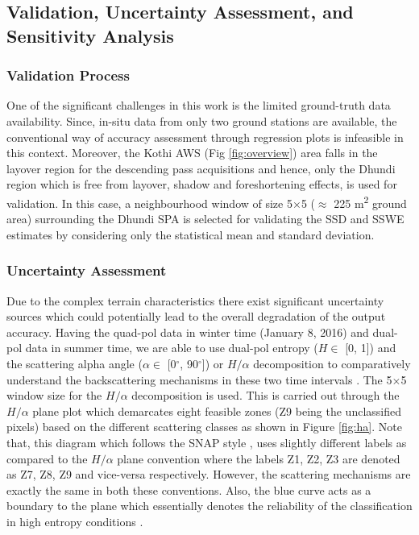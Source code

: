 \documentclass[12pt]{elsarticle}
\numberwithin{equation}{section}
\numberwithin{figure}{section}
\numberwithin{table}{section}
\begin{document}
\subsection{Validation, Uncertainty Assessment, and Sensitivity Analysis}
\label{ssec:vus}
\subsubsection{Validation Process}
\label{sssec:val}

One of the significant challenges in this work is the limited ground-truth data availability. Since, in-situ data from only two ground stations are available, the conventional way of accuracy assessment through regression plots \citep{Kugler2015, Leinss2014, Kumar2017} is infeasible in this context. Moreover, the Kothi AWS (Fig \ref{fig:overview}) area falls in the layover region for the descending pass acquisitions and hence, only the Dhundi region which is free from layover, shadow and foreshortening effects, is used for validation. In this case, a neighbourhood window of size 5$\times$5 ($\approx$ 225 m\textsuperscript{2} ground area) surrounding the Dhundi SPA is selected for validating the SSD and SSWE estimates by considering only the statistical mean and standard deviation.

\subsubsection{Uncertainty Assessment}
\label{sssec:ua}

Due to the complex terrain characteristics there exist significant uncertainty sources which could potentially lead to the overall degradation of the output accuracy. Having the quad-pol data in winter time (January 8, 2016) and dual-pol data in summer time, we are able to use dual-pol entropy ($H \in$ [0, 1]) and the scattering alpha angle ($\alpha \in$ [0$^\circ$, 90$^\circ$]) or $H/{\alpha}$ decomposition to comparatively understand the backscattering mechanisms in these two time intervals \citep{Cloude2010, Lee2009, Singh2014}. The 5$\times$5 window size for the $H/{\alpha}$ decomposition is used. This is carried out through the $H/{\alpha}$ plane plot which demarcates eight feasible zones (Z9 being the unclassified pixels) based on the different scattering classes as shown in Figure \ref{fig:ha}. Note that, this diagram which follows the SNAP style \citep{ESA2019}, uses slightly different labels as compared to the \cite{Lee2009} $H/{\alpha}$ plane convention where the labels Z1, Z2, Z3 are denoted as Z7, Z8, Z9 and vice-versa respectively. However, the scattering mechanisms are exactly the same in both these conventions. Also, the blue curve acts as a boundary to the plane which essentially denotes the reliability of the classification in high entropy conditions \citep{Brunner2009}.
\end{document}
